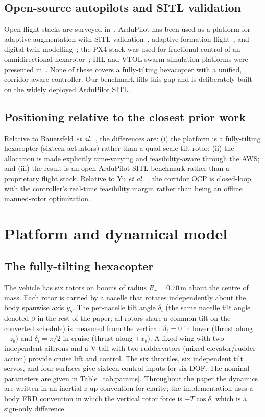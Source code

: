 \documentclass[preprint,3p,11pt]{elsarticle}
\newcommand{\SI}[2]{\ensuremath{#1\,#2}}
\newcommand{\meter}{\mathrm{m}}
\begin{document}
\subsection{Open-source autopilots and SITL validation}
Open flight stacks are surveyed in~\cite{aliane2024opensource}. ArduPilot has
been used as a platform for adaptive augmentation with SITL
validation~\cite{baldi2022ardupilot}, adaptive formation
flight~\cite{yang2019formation}, and digital-twin
modelling~\cite{valencia2025digitaltwin}; the PX4 stack was used for fractional
control of an omnidirectional hexarotor~\cite{deoca2025fractional}; HIL and
VTOL swarm simulation platforms were presented
in~\cite{dai2021rflysim,sethi2022swarm}. None of these covers a fully-tilting
hexacopter with a unified, corridor-aware controller. Our benchmark fills this
gap and is deliberately built on the widely deployed ArduPilot SITL.

\subsection{Positioning relative to the closest prior work}
Relative to Bauersfeld \emph{et al.}~\cite{bauersfeld2021mpc}, the differences
are: (i) the platform is a fully-tilting hexacopter (sixteen actuators) rather
than a quad-scale tilt-rotor; (ii) the allocation is made explicitly
time-varying and feasibility-aware through the AWS; and (iii) the result is an
open ArduPilot SITL benchmark rather than a proprietary flight stack. Relative
to Yu \emph{et al.}~\cite{yu2022pilot}, the corridor OCP is closed-loop with
the controller's real-time feasibility margin rather than being an offline
manned-rotor optimization.

\section{Platform and dynamical model}\label{sec:model}

\subsection{The fully-tilting hexacopter}\label{sec:config}
The vehicle has six rotors on booms of
radius $R_r=\SI{0.70}{\meter}$ about the centre of mass. Each rotor is carried
by a nacelle that rotates independently about the body spanwise axis
$y_b$. The per-nacelle tilt angle $\delta_i$ (the same nacelle tilt angle
denoted $\beta$ in the rest of the paper; all rotors share a common tilt on
the converted schedule) is measured from the vertical:
$\delta_i=0$ in hover (thrust along $+z_b$) and $\delta_i=\pi/2$ in cruise
(thrust along $+x_b$). A fixed wing with two independent ailerons and a
V-tail with two ruddervators (mixed elevator/rudder action) provide cruise
lift and control. The six throttles, six independent tilt servos, and four
surfaces give sixteen control inputs for six DOF. The nominal parameters are
given in Table~\ref{tab:params}. Throughout the paper the dynamics are written
in an inertial $z$-up convention for clarity; the implementation uses a
body FRD convention in which the vertical rotor force is $-T\cos\delta$, which
is a sign-only difference.
\end{document}
